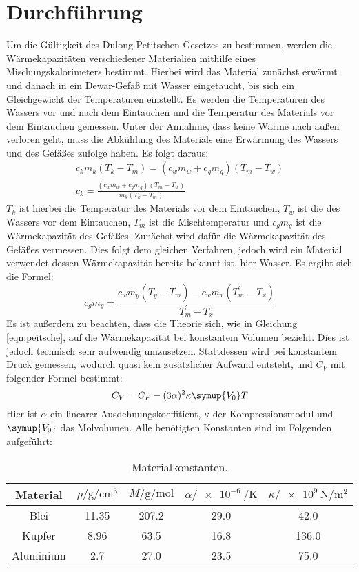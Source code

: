 \section{Durchführung}
\label{sec:Durchführung}
Um die Gültigkeit des Dulong-Petitschen Gesetzes zu bestimmen, werden die Wärmekapazitäten 
verschiedener Materialien
mithilfe eines Mischungskalorimeters bestimmt.
Hierbei wird das Material zunächst erwärmt und danach in ein Dewar-Gefäß mit Wasser eingetaucht,
bis sich ein Gleichgewicht der Temperaturen einstellt.
Es werden die Temperaturen des Wassers vor und nach dem Eintauchen und die Temperatur des Materials vor dem Eintauchen gemessen.
Unter der Annahme, dass keine Wärme nach außen verloren geht,
muss die Abkühlung des Materials eine Erwärmung des Wassers und des Gefäßes zufolge haben.
Es folgt daraus:
\begin{gather}
    c_km_k(T_k-T_m) = (c_wm_w + c_gm_g)(T_m - T_w) \\
    c_k = \frac{(c_wm_w + c_gm_g)(T_m - T_w)}{m_k(T_k - T_m)}
\end{gather}
$T_k$ ist hierbei die Temperatur des Materials vor dem Eintauchen, $T_w$ ist die des Wassers vor dem Eintauchen,
$T_m$ ist die Mischtemperatur und $c_gm_g$ ist die Wärmekapazität des Gefäßes.
Zunächst wird dafür die Wärmekapazität des Gefäßes vermessen. Dies folgt dem gleichen 
Verfahren, jedoch wird ein Material verwendet
dessen Wärmekapazität bereits bekannt ist, hier Wasser.
Es ergibt sich die Formel:
\begin{equation}
    \label{eqn:gefaess}
    c_gm_g = \frac{c_wm_y\left(T_y - T^{\prime}_m\right) - c_wm_x\left(T^{\prime}_m - T_x\right)}{T^{\prime}_m - T_x}
\end{equation}
Es ist außerdem zu beachten, dass die Theorie sich, wie in Gleichung \eqref{eqn:peitsche},
auf die Wärmekapazität bei konstantem Volumen bezieht.
Dies ist jedoch technisch sehr aufwendig umzusetzen. Stattdessen wird bei konstantem Druck 
gemessen,
wodurch quasi kein zusätzlicher Aufwand entsteht, und $C_V$ mit folgender Formel bestimmt:
\begin{equation}
    \label{eqn:dubbi}
    C_V = C_P - (3\alpha)^2\kappa\symup{V_0}T
\end{equation}
Hier ist $\alpha$ ein linearer Ausdehnungskoeffitient, $\kappa$ der Kompressionsmodul und $\symup{V_0}$ das Molvolumen.
Alle benötigten Konstanten sind im Folgenden aufgeführt:
\begin{table}
    \centering
    \caption{Materialkonstanten\cite{v201}.}
    \label{tab:const}
    \begin{tabular}{c S[table-format=2.2(0)e0] S[table-format=3.1(0)e0] S[table-format=2.1] S[table-format=3.1(0)e0] }
        \toprule
        {Material} & {$ρ/\si{\gram\per\cm\cubed}$} & {$M/\si{\gram\per\mol}$} & {$α/\SI{e-6}{\per\kelvin}$} & {$κ/\SI{e9}{\newton\per\meter\squared}$} \\
        \midrule
        {Blei} & 11.35 & 207.2 & 29.0  & 42.0  \\
        {Kupfer} & 8.96  & 63.5  & 16.8  & 136.0     \\
        {Aluminium} & 2.7   & 27.0  & 23.5  & 75.0  \\
        \bottomrule
    \end{tabular}
\end{table}
